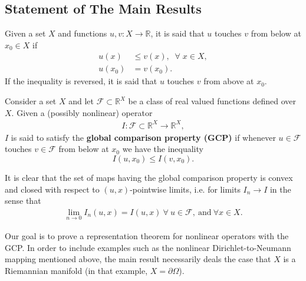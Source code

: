 \documentclass[11pt,reqno]{amsart}
\numberwithin{equation}{section}
\theoremstyle{plain}
\def\Om{\Omega}
\begin{document}
\subsection{Statement of The Main Results}\label{subsec: Main Results}

\begin{DEF}\label{def: touching from below}
  Given a set $X$ and functions $u,v:X\to\mathbb{R}$, it is said that $u$ touches $v$ from below at $x_0 \in X$ if
  \begin{align*}
    u(x) & \leq  v(x),\;\;\forall\;x\in X,\\
    u(x_0) & = v(x_0). 		
  \end{align*}	
  If the inequality is reversed, it is said that $u$ touches $v$ from above at $x_0$.	 
\end{DEF}

   
\begin{DEF}\label{def: operators with maximum principle}
  Consider a set $X$ and let $\mathcal{F}\subset \mathbb{R}^X $ be a class of real valued functions defined over $X$. Given a (possibly nonlinear) operator
  \begin{align*}
    I: \mathcal{F} \subset \mathbb{R}^X \to \mathbb{R}^X, 	  
  \end{align*}	  	
  $I$ is said to satisfy the \textbf{global comparison property (GCP)} if whenever $u \in \mathcal{F}$ touches $v \in \mathcal{F}$ from below at $x_0$ we have the inequality
  \begin{equation*}
    I(u,x_0)\leq I(v,x_0).	
  \end{equation*} 
\end{DEF}

\begin{rem}\label{rem: GCP is convex and closed} It is clear that the set of maps having the global comparison property is convex and closed with respect to $(u,x)$-pointwise limits, i.e. for limits $I_n\to I$ in the sense that
	\begin{align*}
		\lim_{n\to 0} I_n(u,x) = I(u,x)\ \forall\ u\in\mathcal{F},\ \text{and}\ \forall x\in X.
	\end{align*} 
	
\end{rem}

Our goal is to prove a representation theorem for nonlinear operators with the GCP.  In order to include examples such as the nonlinear Dirichlet-to-Neumann mapping mentioned above, the main result necessarily deals the case that $X$ is a Riemannian manifold  (in that example, $X=\partial\Om$).
\end{document}

